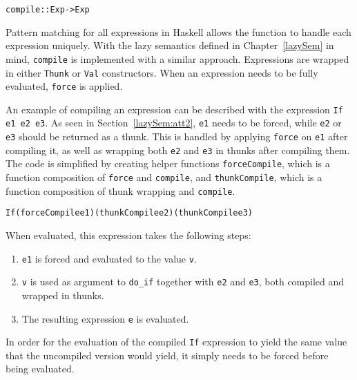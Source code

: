\begin{alltt}
  compile :: Exp -> Exp
\end{alltt}

\noindent Pattern matching for all expressions in Haskell allows the function to
handle each expression uniquely. With the lazy semantics defined in
Chapter~\ref{lazySem} in mind, \texttt{compile} is implemented with a similar
approach. Expressions are wrapped in either \texttt{Thunk} or
\texttt{Val} constructors. When an expression needs to be fully evaluated,
\texttt{force} is applied.

An example of compiling an expression can be described with the expression
\texttt{If e1 e2 e3}. As seen in Section~\ref{lazySem:att2}, \texttt{e1} needs
to be forced, while \texttt{e2} or \texttt{e3} should be returned as a thunk.
This is handled by applying \texttt{force} on \texttt{e1} after compiling it,
as well as wrapping both \texttt{e2} and \texttt{e3} in thunks after compiling them.
The code is simplified by creating helper functions \texttt{forceCompile},
which is a function composition of \texttt{force} and \texttt{compile}, and
\texttt{thunkCompile}, which is a function composition of thunk wrapping and
\texttt{compile}.

\begin{alltt}
  If (forceCompile e1) (thunkCompile e2) (thunkCompile e3)
\end{alltt}

\noindent When evaluated, this expression takes the following steps:

\begin{enumerate}
\item \texttt{e1} is forced and evaluated to the value \texttt{v}.
\item \texttt{v} is used as argument to \texttt{do\_if} together with \texttt{e2} and \texttt{e3}, both compiled and wrapped in thunks.
\item The resulting expression \texttt{e} is evaluated.
\end{enumerate}

\noindent In order for the evaluation of the compiled \texttt{If} expression to
yield the same value that the uncompiled version would yield, it simply
needs to be forced before being evaluated.

